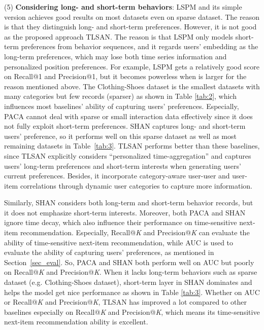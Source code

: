\documentclass[preprint,12pt]{elsarticle}
\newcommand{\tool}{TLSAN\xspace}
\begin{document}
\begin{sloppypar}
(5) \textbf{Considering long- and short-term behaviors}: LSPM and its simple version achieves good results on most datasets even on sparse dataset. The reason is that they distinguish long- and short-term preferences. However, it is not good as the proposed approach \tool. The reason is that LSPM only models short-term preferences from behavior sequences, and it regards users' embedding as the long-term preferences, which may lose both time series information and personalized position preferences. For example, LSPM gets a relatively good score on Recall@1 and Precision@1, but it becomes powerless when  is larger for the reason mentioned above. The Clothing-Shoes dataset is the smallest datasets with many categories but few records (sparser) as shown in Table \ref{tab:2}, which influences most baselines' ability of capturing users' preferences. Especially, PACA cannot deal with sparse or small interaction data effectively since it does not fully exploit short-term preferences. SHAN captures long- and short-term users' preference, so it performs well on this sparse dataset as well as most remaining datasets in Table~\ref{tab:3}. \tool performs better than these baselines, since \tool explicitly considers ``personalized time-aggregation'' and captures users' long-term preferences and short-term interests when generating users' current preferences. Besides, it incorporate category-aware user-user and user-item correlations through dynamic user categories to capture more information. 

Similarly, SHAN considers both long-term and short-term behavior records, but it does not emphasize short-term interests. 
Moreover, both PACA and SHAN ignore time decay, which also influence their performance on time-sensitive next-item recommendation. Especially, Recall@\emph{K} and Precision@\emph{K} can evaluate the ability of time-sensitive next-item recommendation, while AUC is used to evaluate the ability of capturing users' preferences, as mentioned in Section~\ref{sec_eval}. So, PACA and SHAN both perform well on AUC but poorly on Recall@\emph{K} and Precision@\emph{K}. When it lacks long-term behaviors such as sparse dataset (e.g. Clothing-Shoes dataset), short-term layer in SHAN dominates and helps the model get nice performance as shown in Table \ref{tab:3}. Whether on AUC or Recall@\emph{K} and Precision@\emph{K}, \tool has improved a lot compared to other baselines especially on Recall@\emph{K} and Precision@\emph{K}, which means its time-sensitive next-item recommendation ability is excellent.


\end{sloppypar}
\end{document}

